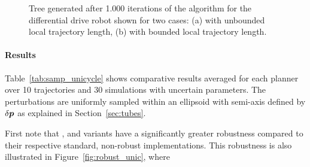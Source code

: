 \begin{figure} [h]
    \centering
    \caption{Tree generated after 1.000 iterations of the  algorithm for the differential drive robot shown for two cases: (a) with unbounded local trajectory length, (b) with bounded local trajectory length.}%
    \label{fig:unic_tree}%
\end{figure}

\paragraph{Results}



Table~\ref{tab:samp_unicycle} shows comparative results averaged for each planner over 10 trajectories and 30 simulations with uncertain parameters. 
The perturbations are uniformly sampled within an ellipsoid with semi-axis defined by $\delta \boldsymbol{p}$ as explained in Section~\ref{sec:tubes}.

First note that , and  variants have a significantly greater robustness compared to their respective standard, non-robust implementations.
This robustness is also illustrated in Figure~\ref{fig:robust_unic}, where 

